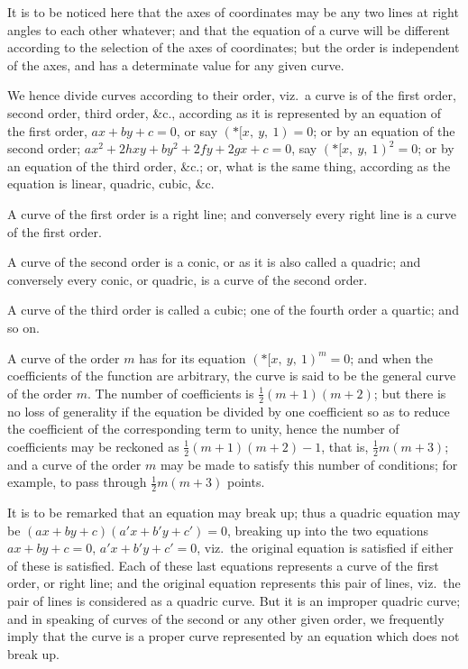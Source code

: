 \documentclass[12pt,a4paper,oneside]{book}
\begin{document}
It is to be noticed here that the axes of coordinates may be any two lines at right angles to each other whatever; and that the equation of a curve will be different according to the selection of the axes of coordinates; but the order is independent of the axes, and has a determinate value for any given curve.

\newpage
We hence divide curves according to their order, viz.\ a curve is of the first order, second order, third order, \&c., according as it is represented by an equation of the first order, $ax+by+c=0$, or say $(*\!\![ x,\ y,\ 1)=0$; or by an equation of the second order; $ax^{2}+2hxy+by^{2}+2fy+2gx+c=0$, say $(*\!\![ x,\ y,\ 1)^{2}=0$; or by an equation of the third order, \&c.; or, what is the same thing, according as the equation is linear, quadric, cubic, \&c.

A curve of the first order is a right line; and conversely every right line is a curve of the first order.

A curve of the second order is a conic, or as it is also called a quadric; and conversely every conic, or quadric, is a curve of the second order.

A curve of the third order is called a cubic; one of the fourth order a quartic; and so on.

A curve of the order $m$ has for its equation $(*\!\![ x,\ y,\ 1)^{m}=0$; and when the coefficients of the function are arbitrary, the curve is said to be the general curve of the order $m$. The number of coefficients is $\tfrac{1}{2}(m+1)(m+2)$; but there is no loss of generality if the equation be divided by one coefficient so as to reduce the coefficient of the corresponding term to unity, hence the number of coefficients may be reckoned as $\tfrac{1}{2}(m+1)(m+2)-1$, that is, $\tfrac{1}{2}m(m+3)$; and a curve of the order $m$ may be made to satisfy this number of conditions; for example, to pass through $\tfrac{1}{2}m(m+3)$ points.

It is to be remarked that an equation may break up; thus a quadric equation may be $(ax+by+c)(a'x+b'y+c')=0$, breaking up into the two equations $ax+by+c=0$, $a'x+b'y+c'=0$, viz.\ the original equation is satisfied if either of these is satisfied. Each of these last equations represents a curve of the first order, or right line; and the original equation represents this pair of lines, viz.\ the pair of lines is considered as a quadric curve. But it is an improper quadric curve; and in speaking of curves of the second or any other given order, we frequently imply that the curve is a proper curve represented by an equation which does not break up.
\end{document}
